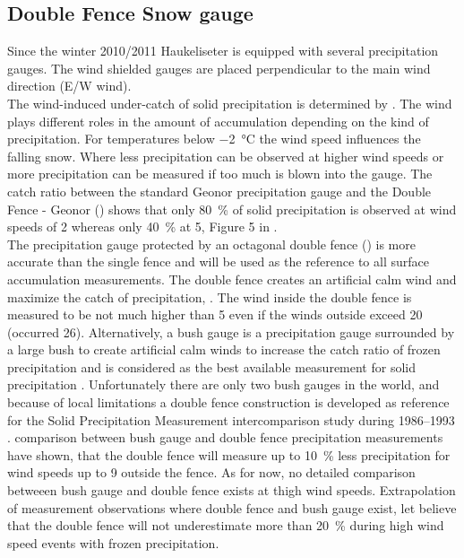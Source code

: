 \subsection{Double Fence Snow gauge}\label{sec:dofe}

Since the winter 2010/2011 Haukeliseter is equipped with several precipitation gauges. The wind shielded gauges are placed perpendicular to the main wind direction (E/W wind).
\\
The wind-induced under-catch of solid precipitation is determined by \citet{wolff_derivation_2015}. The wind plays different roles in the amount of accumulation depending on the kind of precipitation. For temperatures below \SI{-2}{\celsius} the wind speed influences the falling snow. Where less precipitation can be observed at higher wind speeds or more precipitation can be measured if too much is blown into the gauge. The catch ratio between the standard Geonor precipitation gauge and the Double Fence - Geonor () shows that only \SI{80}{\percent} of solid precipitation is observed at wind speeds of \SI{2}{\mPs} whereas only \SI{40}{\percent} at \SI{5}{\mPs}, Figure 5 in \citet{wolff_derivation_2015}. 
\\
The precipitation gauge protected by an octagonal double fence () is more accurate than the single fence and will be used as the reference to all surface accumulation measurements. The double fence creates an artificial calm wind and maximize the catch of precipitation, \citep{wolff_new_2010, wolff_measurements_2013, wolff_derivation_2015}. The wind inside the double fence is measured to be not much higher than \SI{5}{\mPs} even if the winds outside exceed \SI{20}{\mPs} (occurred \SI{26}{\dec}). %
Alternatively, a bush gauge is a precipitation gauge surrounded by a large bush to create artificial calm winds to increase the catch ratio of frozen precipitation and is considered as the best available measurement for solid precipitation \citep{wolff_wmo_2018}. Unfortunately there are only two bush gauges in the world, and because of local limitations a double fence construction is developed as reference for the Solid Precipitation Measurement intercomparison study during \numrange{1986}{1993} \citep{goodison_wmo_1998}. \citet{wolff_wmo_2018} comparison between bush gauge and double fence precipitation measurements have shown, that the double fence will measure up to \SI{10}{\percent} less precipitation for wind speeds up to \SI{9}{\mPs} outside the fence. As for now, no detailed comparison betweeen bush gauge and double fence exists at thigh wind speeds. Extrapolation of measurement observations where double fence and bush gauge exist, let believe that the double fence will not underestimate more than \SI{20}{\percent} during high wind speed events with frozen precipitation. 

